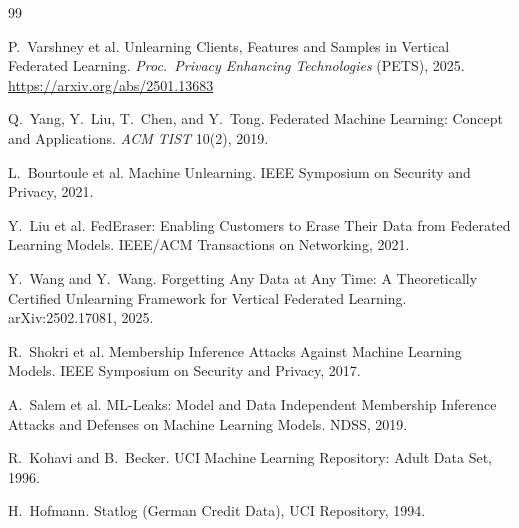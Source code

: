 \documentclass[sigconf,nonacm]{acmart}
\begin{document}

\begin{thebibliography}{99}

P.~Varshney et al.
\newblock Unlearning Clients, Features and Samples in Vertical Federated Learning.
\newblock \emph{Proc.\ Privacy Enhancing Technologies} (PETS), 2025.
\newblock \url{https://arxiv.org/abs/2501.13683}

Q.~Yang, Y.~Liu, T.~Chen, and Y.~Tong.
\newblock Federated Machine Learning: Concept and Applications.
\newblock \emph{ACM TIST} 10(2), 2019.

L.~Bourtoule et al.
\newblock Machine Unlearning.
\newblock IEEE Symposium on Security and Privacy, 2021.

Y.~Liu et al.
\newblock FedEraser: Enabling Customers to Erase Their Data from Federated Learning Models.
\newblock IEEE/ACM Transactions on Networking, 2021.

Y.~Wang and Y.~Wang.
\newblock Forgetting Any Data at Any Time: A Theoretically Certified Unlearning Framework for Vertical Federated Learning.
\newblock arXiv:2502.17081, 2025.

R.~Shokri et al.
\newblock Membership Inference Attacks Against Machine Learning Models.
\newblock IEEE Symposium on Security and Privacy, 2017.

A.~Salem et al.
\newblock ML-Leaks: Model and Data Independent Membership Inference Attacks and Defenses on Machine Learning Models.
\newblock NDSS, 2019.

R.~Kohavi and B.~Becker.
\newblock UCI Machine Learning Repository: Adult Data Set, 1996.

H.~Hofmann.
\newblock Statlog (German Credit Data), UCI Repository, 1994.

\end{thebibliography}
\end{document}
